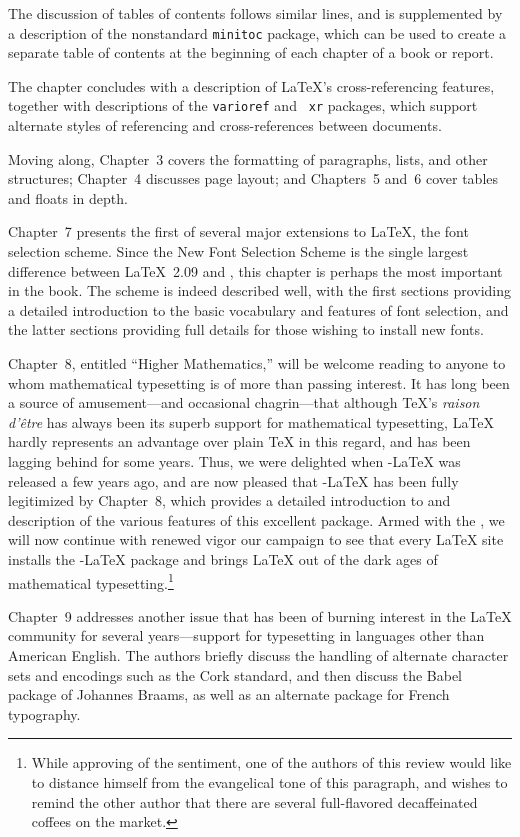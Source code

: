 The discussion of tables of contents follows similar lines, and is
supplemented by a description of the nonstandard {\tt minitoc}
package, which can be used to create a separate table of contents at
the beginning of each chapter of a book or report.

The chapter concludes with a description of \LaTeX's cross-referencing
features, together with descriptions of the {\tt varioref} and {\tt
xr} packages, which support alternate styles of referencing and
cross-references between documents.

Moving along, Chapter~3 covers the formatting of paragraphs, lists,
and other structures; Chapter~4 discusses page layout; and Chapters~5
and~6 cover tables and floats in depth.

Chapter~7 presents the first of several major extensions to \LaTeX,
the \LaTeXe{} font selection scheme.  Since the New Font Selection
Scheme is the single largest difference between \LaTeX~2.09 and
\LaTeXe, this chapter is perhaps the most important in the book.  The
scheme is indeed described well, with the first sections providing a
detailed introduction to the basic vocabulary and features of font
selection, and the latter sections providing full details for those
wishing to install new fonts.

Chapter~8, entitled ``Higher Mathematics,'' will be welcome reading to
anyone to whom mathematical typesetting is of more than passing
interest.  It has long been a source of amusement---and occasional
chagrin---that although \TeX's {\em raison d'\^etre\/} has always been
its superb support for mathematical typesetting, \LaTeX{} hardly
represents an advantage over plain \TeX{} in this regard, and has been
lagging behind \AmSTeX{} for some years.  Thus, we were delighted when
\AmS-\LaTeX{} was released a few years ago, and are now pleased that
\AmS-\LaTeX{} has been fully legitimized by Chapter~8, which provides a
detailed introduction to and description of the various features of
this excellent package.  Armed with the , we will now continue with renewed vigor our campaign to
see that every
\LaTeX{} site installs the \AmS-\LaTeX{} package and brings \LaTeX{}
out of the dark ages of mathematical typesetting.\footnote{While
approving of the sentiment, one of the authors of this review would
like to distance himself from the evangelical tone of this paragraph,
and wishes to remind the other author that there are several
full-flavored decaffeinated coffees on the market.}

Chapter~9 addresses another issue that has been of burning interest in
the \LaTeX{} community for several years---support for typesetting in
languages other than American English. The authors briefly discuss the
handling of alternate character sets and encodings such as the Cork
standard, and then discuss the Babel package of Johannes Braams, as
well as an alternate package for French typography.

